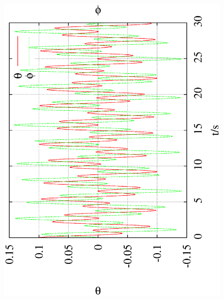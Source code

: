 \documentclass[10pt,a4paper]{article}
\begin{document}
\begin{figure}[h!]
\begin{center}
\includegraphics[scale = 0.2, angle =-90]{0.001_0_1_theta_phi.eps}

\end{center}
\end{figure}
\end{document}
